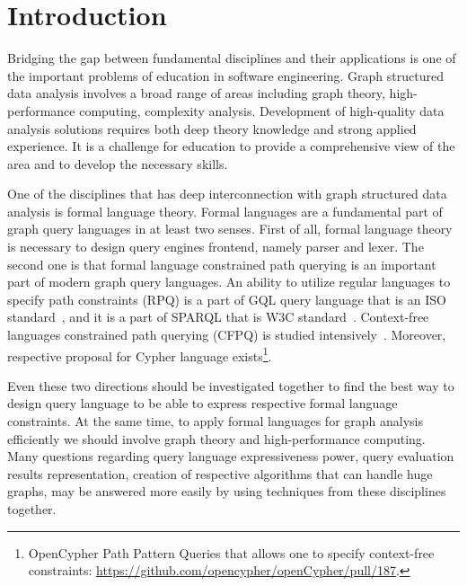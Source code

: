 \documentclass[sigconf]{acmart}
\begin{document}
\section{Introduction}

Bridging the gap between fundamental disciplines and their applications is one of the important problems of education in software engineering.
Graph structured data analysis involves a broad range of areas including graph theory, high-performance computing, complexity analysis.
Development of high-quality data analysis solutions requires both deep theory knowledge and strong applied experience. 
It is a challenge for education to provide a comprehensive view of the area and to develop the necessary skills.

One of the disciplines that has deep interconnection with graph structured data analysis is formal language theory.
Formal languages are a fundamental part of graph query languages in at least two senses.
First of all, formal language theory is necessary to design query engines frontend, namely parser and lexer.
The second one is that formal language constrained path querying is an important part of modern graph query languages. 
An ability to utilize regular languages to specify path constraints (RPQ) is a part of GQL query language that is an ISO standard~\cite{2024gql}, and it is a part of SPARQL that is W3C standard~\cite{2013sparql}.
Context-free languages constrained path querying (CFPQ) is studied intensively~\cite{10.1145/3335783.3335791,10.1145/3167132.3167265,HELLINGS2025102475,10.1145/3398682.3399163}.
Moreover, respective proposal for Cypher language exists\footnote{OpenCypher Path Pattern Queries that allows one to specify context-free constraints: \url{https://github.com/opencypher/openCypher/pull/187}.}.

Even these two directions should be investigated together to find the best way to design query language to be able to express respective formal language constraints.
At the same time, to apply formal languages for graph analysis efficiently we should involve graph theory and high-performance computing.
Many questions regarding query language expressiveness power, query evaluation results representation, creation of respective algorithms that can handle huge graphs, may be answered more easily by using techniques from these disciplines together.
\end{document}

